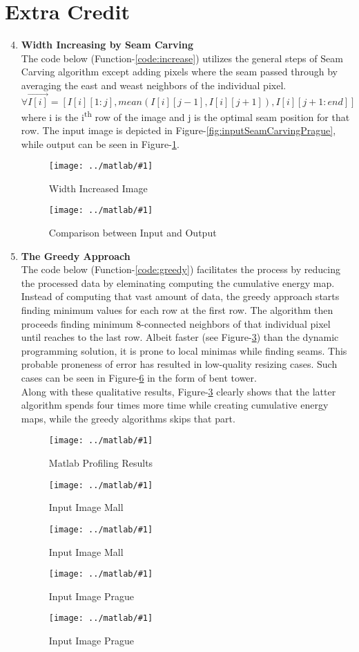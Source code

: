 \documentclass{article}
\newcommand{\listFigure}[3]{ \begin{figure}[H]
\texttt{[image: ../matlab/\#1]}
		\caption{#2\label{fig:#3}}
	\end{figure}		
}
\begin{document}
\section{Extra Credit}
\begin{enumerate}
	\setcounter{enumi}{3}
	\item \textbf{Width Increasing by Seam Carving} \\
	The code below (Function-\ref{code:increase}) utilizes the general steps of
	Seam Carving algorithm except adding pixels where the seam passed through by averaging the east and weast
	neighbors of the individual pixel.
	$$\forall\vec{I[i]} = [I[i][1:j], mean(I[i][j-1],I[i][j+1]),
	I[i][j+1:end]]$$
	where i is the i\textsuperscript{th} row of the image
	and j is the optimal seam position for that row. The input image is depicted in
	Figure-\ref{fig:inputSeamCarvingPrague}, while output can be seen in
	Figure-\ref{fig:increaseWidth}.
	\label{code:increase}
	
	\listFigure{increaseWidth.png}{Width
	Increased Image}{increaseWidth} 
	\listFigure{outputIncreaseWidthComparisonOutputsPrague.png}{Comparison
	between Input and Output}{outputIncreaseWidthComparisonOutputsPrague}
	
	\item \textbf{The Greedy Approach} \\
	The code below (Function-\ref{code:greedy}) facilitates the process by reducing
	the processed data by eleminating computing the cumulative energy map. Instead
	of computing that vast amount of data, the greedy approach starts finding
	minimum values for each row at the first row. The algorithm then proceeds
	finding minimum 8-connected neighbors of that individual pixel until reaches to
	the last row.
	Albeit faster (see Figure-\ref{fig:profile}) than the dynamic programming
	solution, it is prone to local minimas while finding seams. This
	probable proneness of error has resulted in low-quality resizing cases. Such
	cases can be seen in Figure-\ref{fig:outputWidthPrague} in the form of bent
	tower. \\
	Along with these qualitative results, Figure-\ref{fig:profile} clearly shows
	that the latter algorithm spends four times more time while creating cumulative energy maps, while the greedy algorithms skips that part.
	\listFigure{profile.png}{Matlab Profiling Results}{profile}
	\listFigure{outputWidthMall.png}{Input Image Mall}{outputWidthMall}
	\listFigure{outputHeightMall.png}{Input Image Mall}{outputHeightMall}
	\listFigure{outputWidthPrague.png}{Input Image Prague}{outputWidthPrague}
	\listFigure{outputHeightPrague.png}{Input Image Prague}{outputHeightPrague}
	\label{code:greedy}
	
\end{enumerate}
\end{document}
